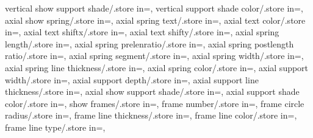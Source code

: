{vertical show support shade/.store in=\vershowsuppshade,
vertical support shade color/.store in=\versuppshadecol,
axial show spring/.store in=\showaxialspring,
axial spring text/.store in=\axialspringtext,
axial text color/.store in=\axialtextcolor,
axial text shiftx/.store in=\axialtextshiftx,
axial text shifty/.store in=\axialtextshifty,
axial spring length/.store in=\axialspringlength,
axial spring prelenratio/.store in=\axialspringprelenratio,
axial spring postlength ratio/.store in=\axialspringpostlenratio,
axial spring segment/.store in=\axialspringsegm,
axial spring width/.store in=\axialspringwidth,
axial spring line thickness/.store in=\axialspringlinethk,
axial spring color/.store in=\axialspringcolor,
axial support width/.store in=\axialsuppwidth,
axial support depth/.store in=\axialsuppdepth,
axial support line thickness/.store in=\axialsupplinethk,
axial show support shade/.store in=\axialshowsuppshade,
axial support shade color/.store in=\axialsuppshadecol,
show frames/.store in=\showframes,
frame number/.store in=\framenumber,
frame circle radius/.store in=\framecirclerad,
frame line thickness/.store in=\framelinethk,
frame line color/.store in=\framelinecolor,
frame line type/.store in=\framelinetype,}

